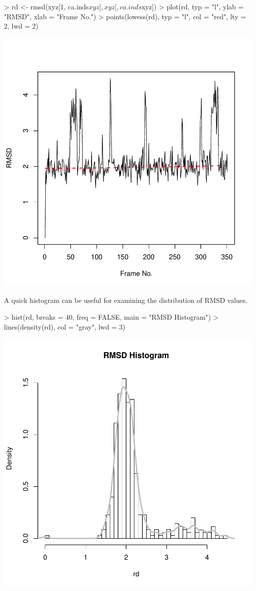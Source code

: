 \documentclass[letter]{article}
\begin{document}
\begin{Schunk}
\begin{Sinput}
> rd <- rmsd(xyz[1, ca.inds$xyz], xyz[, ca.inds$xyz])
> plot(rd, typ = "l", ylab = "RMSD", xlab = "Frame No.")
> points(lowess(rd), typ = "l", col = "red", lty = 2, lwd = 2)
\end{Sinput}
\end{Schunk}
\includegraphics{Bio3D_trajectory-008}

A quick histogram can be useful for examining the distribution of RMSD values.
\begin{Schunk}
\begin{Sinput}
> hist(rd, breaks = 40, freq = FALSE, main = "RMSD Histogram")
> lines(density(rd), col = "gray", lwd = 3)
\end{Sinput}
\end{Schunk}
\includegraphics{Bio3D_trajectory-009}
\end{document}

